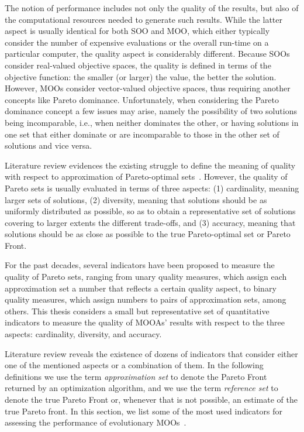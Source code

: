 	The notion of performance includes not only the quality of the results, but also of the computational resources needed to generate such results. While the latter aspect is usually identical for both \ac{SOO} and \ac{MOO}, which either typically consider the number of expensive evaluations or the overall run-time on a particular computer, the quality aspect is considerably different. Because \acp{SOO} consider real-valued objective spaces, the quality is defined in terms of the objective function: the smaller (or larger) the value, the better the solution. However, \acp{MOO} consider vector-valued objective spaces, thus requiring another concepts like Pareto dominance. Unfortunately, when considering the Pareto dominance concept a few issues may arise, namely the possibility of two solutions being incomparable, i.e., when neither dominates the other, or having solutions in one set that either dominate or are incomparable to those in the other set of solutions and vice versa. 
	
	Literature review evidences the existing struggle to define the meaning of quality with respect to approximation of Pareto-optimal sets~\cite{Knowles2002Metrics,Riquelme2015}. However, the quality of Pareto sets is usually evaluated in terms of three aspects: (1) cardinality, meaning larger sets of solutions, (2) diversity, meaning that solutions should be as uniformly distributed as possible, so as to obtain a representative set of solutions covering to larger extents the different trade-offs, and (3) accuracy, meaning that solutions should be as close as possible to the true Pareto-optimal set or Pareto Front. 
	
	For the past decades, several indicators have been proposed to measure the quality of Pareto sets, ranging from unary quality measures, which assign each approximation set a number that reflects a certain quality aspect, to binary quality measures, which assign numbers to pairs of approximation sets, among others. This thesis considers a small but representative set of quantitative indicators to measure the quality of \acp{MOOA}' results with respect to the three aspects: cardinality, diversity, and accuracy. 
	
	Literature review reveals the existence of dozens of indicators that consider either one of the mentioned aspects or a combination of them. In the following definitions we use the term \textit{approximation set} to denote the Pareto Front returned by an optimization algorithm, and we use the term \textit{reference set} to denote the true Pareto Front or, whenever that is not possible, an estimate of the true Pareto front. 
	In this section, we list some of the most used indicators for assessing the performance of evolutionary \acp{MOO}~\cite{Riquelme2015}. 
	
